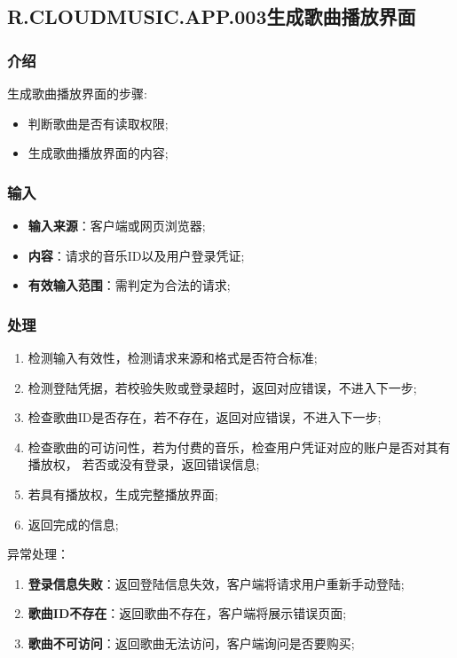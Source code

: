 \subsection{R.CLOUDMUSIC.APP.003生成歌曲播放界面}
\subsubsection{介绍}
生成歌曲播放界面的步骤:
	\begin{itemize}
		\item 判断歌曲是否有读取权限;
		\item 生成歌曲播放界面的内容;
	\end{itemize}
\subsubsection{输入}
	\begin{itemize}
		\item \textbf{输入来源}：客户端或网页浏览器;
		\item \textbf{内容}：请求的音乐ID以及用户登录凭证;
		\item \textbf{有效输入范围}：需判定为合法的请求;
	\end{itemize}
\subsubsection{处理}
	\begin{enumerate}
		\item 检测输入有效性，检测请求来源和格式是否符合标准;
		\item 检测登陆凭据，若校验失败或登录超时，返回对应错误，不进入下一步;
		\item 检查歌曲ID是否存在，若不存在，返回对应错误，不进入下一步;
		\item 检查歌曲的可访问性，若为付费的音乐，检查用户凭证对应的账户是否对其有播放权，
			若否或没有登录，返回错误信息;
		\item 若具有播放权，生成完整播放界面;
		\item 返回完成的信息;
	\end{enumerate}
	\noindent 异常处理：
	\begin{enumerate}
		\item \textbf{登录信息失败}：返回登陆信息失效，客户端将请求用户重新手动登陆;
		\item \textbf{歌曲ID不存在}：返回歌曲不存在，客户端将展示错误页面;
		\item \textbf{歌曲不可访问}：返回歌曲无法访问，客户端询问是否要购买;
	\end{enumerate}
